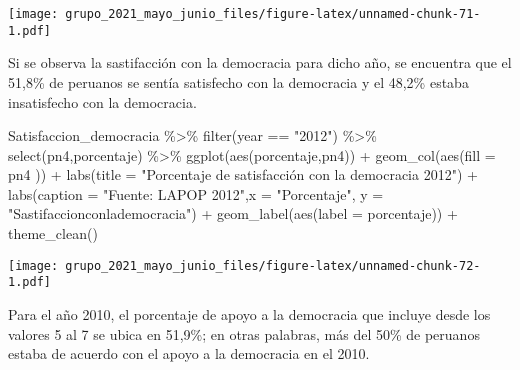 \documentclass[
]{book}
\newenvironment{Shaded}{\begin{snugshade}}{\end{snugshade}}
\newcommand{\AttributeTok}[1]{\textcolor[rgb]{0.77,0.63,0.00}{#1}}
\newcommand{\FunctionTok}[1]{\textcolor[rgb]{0.00,0.00,0.00}{#1}}
\newcommand{\NormalTok}[1]{#1}
\newcommand{\SpecialCharTok}[1]{\textcolor[rgb]{0.00,0.00,0.00}{#1}}
\newcommand{\StringTok}[1]{\textcolor[rgb]{0.31,0.60,0.02}{#1}}
\begin{document}
\texttt{[image: grupo\_2021\_mayo\_junio\_files/figure-latex/unnamed-chunk-71-1.pdf]}

Si se observa la sastifacción con la democracia para dicho año, se encuentra que el 51,8\% de peruanos se sentía satisfecho con la democracia y el 48,2\% estaba insatisfecho con la democracia.

\begin{Shaded}
\begin{Highlighting}[]
\NormalTok{Satisfaccion\_democracia }\SpecialCharTok{\%\textgreater{}\%}
  \FunctionTok{filter}\NormalTok{(year }\SpecialCharTok{==} \StringTok{"2012"}\NormalTok{) }\SpecialCharTok{\%\textgreater{}\%}
  \FunctionTok{select}\NormalTok{(pn4,porcentaje) }\SpecialCharTok{\%\textgreater{}\%}
  \FunctionTok{ggplot}\NormalTok{(}\FunctionTok{aes}\NormalTok{(porcentaje,pn4)) }\SpecialCharTok{+} 
  \FunctionTok{geom\_col}\NormalTok{(}\FunctionTok{aes}\NormalTok{(}\AttributeTok{fill =}\NormalTok{ pn4 )) }\SpecialCharTok{+}
  \FunctionTok{labs}\NormalTok{(}\AttributeTok{title =} \StringTok{"Porcentaje de satisfacción con la democracia 2012"}\NormalTok{) }\SpecialCharTok{+}
  \FunctionTok{labs}\NormalTok{(}\AttributeTok{caption =} \StringTok{"Fuente: LAPOP 2012"}\NormalTok{,}\AttributeTok{x =} \StringTok{"Porcentaje"}\NormalTok{, }\AttributeTok{y =} \StringTok{"Sastifaccionconlademocracia"}\NormalTok{) }\SpecialCharTok{+}
  \FunctionTok{geom\_label}\NormalTok{(}\FunctionTok{aes}\NormalTok{(}\AttributeTok{label =}\NormalTok{ porcentaje)) }\SpecialCharTok{+}
  \FunctionTok{theme\_clean}\NormalTok{()}
\end{Highlighting}
\end{Shaded}

\texttt{[image: grupo\_2021\_mayo\_junio\_files/figure-latex/unnamed-chunk-72-1.pdf]}

Para el año 2010, el porcentaje de apoyo a la democracia que incluye desde los valores 5 al 7 se ubica en 51,9\%; en otras palabras, más del 50\% de peruanos estaba de acuerdo con el apoyo a la democracia en el 2010.
\end{document}
